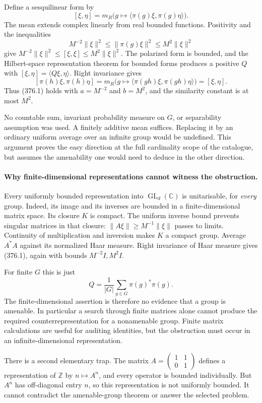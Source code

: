 \documentclass[11pt]{article}
\begin{document}
Define a sesquilinear form by
\[
 [\xi,\eta]=m_R\bigl(g\mapsto
                \langle\pi(g)\xi,\pi(g)\eta\rangle\bigr).
\]
The mean extends complex linearly from real bounded functions. Positivity
and the inequalities
\[
 M^{-2}\|\xi\|^2\le\|\pi(g)\xi\|^2\le M^2\|\xi\|^2
\]
give
$M^{-2}\|\xi\|^2\le[\xi,\xi]\le M^2\|\xi\|^2$.
The polarized form is bounded, and the Hilbert-space representation
theorem for bounded forms produces a positive $Q$ with
$[\xi,\eta]=\langle Q\xi,\eta\rangle$. Right invariance gives
\[
 [\pi(h)\xi,\pi(h)\eta]
 =m_R\bigl(g\mapsto\langle\pi(gh)\xi,\pi(gh)\eta\rangle\bigr)
 =[\xi,\eta].
\]
Thus (376.1) holds with $a=M^{-2}$ and $b=M^2$, and the similarity
constant is at most $M^2$.

No countable sum, invariant probability measure on $G$, or separability
assumption was used. A finitely additive mean suffices. Replacing it
by an ordinary uniform average over an infinite group would be undefined.
This argument proves the easy direction at the full cardinality scope
of the catalogue, but assumes the amenability one would need to deduce
in the other direction.

\paragraph{Why finite-dimensional representations cannot witness the obstruction.}
Every uniformly bounded representation into $\operatorname{GL}_d(\mathbb C)$
is unitarisable, for \emph{every} group. Indeed, its image and its
inverses are bounded in a finite-dimensional matrix space. Its closure
$K$ is compact. The uniform inverse bound prevents singular matrices in
that closure: $\|A\xi\|\ge M^{-1}\|\xi\|$ passes to limits.
Continuity of multiplication and inversion makes $K$ a compact group.
Average $A^*A$ against its normalized Haar measure. Right invariance of
Haar measure gives (376.1), again with bounds $M^{-2}I,M^2I$.

For finite $G$ this is just
\[
 Q=\frac1{|G|}\sum_{g\in G}\pi(g)^*\pi(g).
\]
The finite-dimensional assertion is therefore no evidence that a group
is amenable. In particular a search through finite matrices alone cannot
produce the required counterrepresentation for a nonamenable group.
Finite matrix calculations are useful for auditing identities, but the
obstruction must occur in an infinite-dimensional representation.

There is a second elementary trap. The matrix
$A=\left(\begin{smallmatrix}1&1\\0&1\end{smallmatrix}\right)$ defines
a representation of $\mathbb Z$ by $n\mapsto A^n$, and every operator
is bounded individually. But $A^n$ has off-diagonal entry $n$, so this
representation is not uniformly bounded. It cannot contradict the
amenable-group theorem or answer the selected problem.
\end{document}
